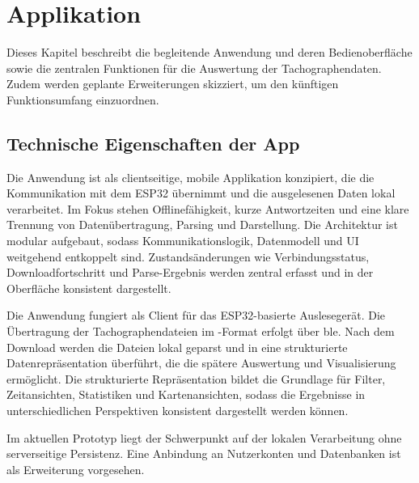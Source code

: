 \chapter{Applikation}
Dieses Kapitel beschreibt die begleitende Anwendung und deren Bedienoberfläche sowie die zentralen Funktionen für die Auswertung der Tachographendaten. Zudem werden geplante Erweiterungen skizziert, um den künftigen Funktionsumfang einzuordnen.

\section{Technische Eigenschaften der App}
Die Anwendung ist als clientseitige, mobile Applikation konzipiert, die die Kommunikation mit dem ESP32 übernimmt und die ausgelesenen Daten lokal verarbeitet. Im Fokus stehen Offlinefähigkeit, kurze Antwortzeiten und eine klare Trennung von Datenübertragung, Parsing und Darstellung. Die Architektur ist modular aufgebaut, sodass Kommunikationslogik, Datenmodell und UI weitgehend entkoppelt sind. Zustandsänderungen wie Verbindungsstatus, Downloadfortschritt und Parse-Ergebnis werden zentral erfasst und in der Oberfläche konsistent dargestellt.

Die Anwendung fungiert als Client für das ESP32-basierte Auslesegerät. Die Übertragung der Tachographendateien im -Format erfolgt über \gls{ble}. Nach dem Download werden die Dateien lokal geparst und in eine strukturierte Datenrepräsentation überführt, die die spätere Auswertung und Visualisierung ermöglicht.
Die strukturierte Repräsentation bildet die Grundlage für Filter, Zeitansichten, Statistiken und Kartenansichten, sodass die Ergebnisse in unterschiedlichen Perspektiven konsistent dargestellt werden können.

Im aktuellen Prototyp liegt der Schwerpunkt auf der lokalen Verarbeitung ohne serverseitige Persistenz. Eine Anbindung an Nutzerkonten und Datenbanken ist als Erweiterung vorgesehen.
\newpage
